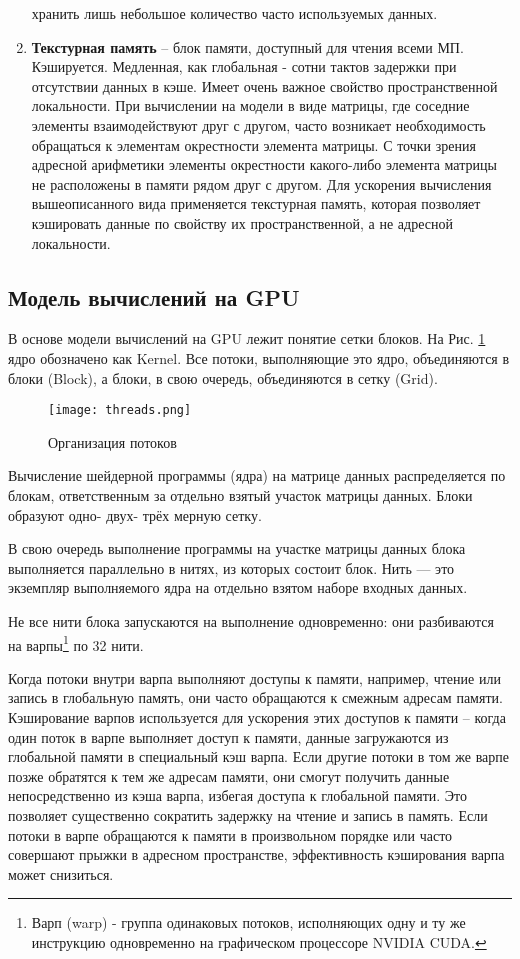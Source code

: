 \documentclass[a4paper, 12pt]{article}
\begin{document}
\begin{enumerate}
    хранить лишь небольшое количество часто используемых данных.
    \item \textbf{Текстурная память} --  блок памяти, доступный для чтения всеми МП. Кэшируется. Медленная, как глобальная - сотни тактов задержки при 
    отсутствии данных в кэше. Имеет очень важное свойство пространственной локальности. При вычислении на модели в виде матрицы, где соседние
    элементы взаимодействуют друг с другом, часто возникает необходимость обращаться к элементам окрестности элемента матрицы. С точки зрения адресной арифметики элементы окрестности какого-либо элемента матрицы не расположены в памяти рядом друг с другом. Для ускорения вычисления вышеописанного вида применяется текстурная память, которая позволяет кэшировать данные по свойству их пространственной, а не адресной локальности.
    \end{enumerate}
    \subsection{Модель вычислений на GPU}
    В основе модели вычислений на GPU лежит понятие сетки блоков.  На Рис. \ref{threads} ядро обозначено как Kernel. Все потоки, выполняющие это ядро, объединяются в блоки (Block), а блоки, в свою очередь, объединяются в сетку (Grid).

    \clearpage
    \begin{figure}[h!]
    	\centering\texttt{[image: threads.png]}
         \caption{Организация потоков}	
     \label{threads}
    \end{figure}
    
    Вычисление шейдерной программы (ядра) на матрице данных распределяется по блокам, ответственным за отдельно взятый участок матрицы данных. Блоки образуют одно- двух- трёх мерную сетку.
    
    В свою очередь выполнение программы на участке матрицы данных блока выполняется параллельно в нитях, из которых состоит блок. Нить — это экземпляр выполняемого ядра на отдельно взятом наборе входных данных. 
    
    Не все нити блока запускаются на выполнение одновременно: они разбиваются на варпы\footnote{Варп (warp) - группа одинаковых потоков, исполняющих одну и ту же инструкцию одновременно на графическом процессоре NVIDIA CUDA.} по 32 нити. 

    Когда потоки внутри варпа выполняют доступы к памяти, например, чтение или запись в глобальную память, они часто обращаются к смежным адресам памяти. Кэширование варпов используется для ускорения этих доступов к памяти --  когда один поток в варпе выполняет доступ к памяти, данные загружаются из глобальной памяти в специальный кэш варпа. Если другие потоки в том же варпе позже обратятся к тем же адресам памяти, они смогут получить данные непосредственно из кэша варпа, избегая доступа к глобальной памяти. Это позволяет существенно сократить задержку на чтение и запись в память. Если потоки в варпе обращаются к памяти в произвольном порядке или часто совершают прыжки в адресном пространстве, эффективность кэширования варпа может снизиться.
    
\end{document}
